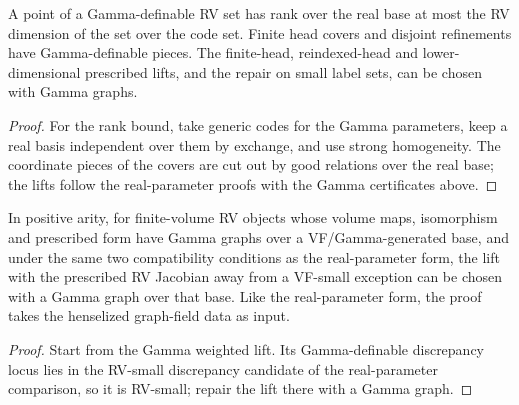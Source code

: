 \begin{lemma}
\label{lem:gamma-head-lifts}
\leanok
A point of a Gamma-definable RV set has rank over the real base at most
the RV dimension of the set over the code set. Finite head covers and disjoint
refinements have Gamma-definable pieces. The finite-head,
reindexed-head and lower-dimensional prescribed lifts, and the repair
on small label sets, can be chosen with Gamma graphs.
\end{lemma}
\begin{proof}
\leanok
For the rank bound, take generic codes for the Gamma parameters,
keep a real basis independent over them by exchange, and use strong
homogeneity. The coordinate pieces of the covers are cut out by good
relations over the real base; the lifts follow the real-parameter
proofs with the Gamma certificates above.
\end{proof}

\begin{theorem}
\label{thm:gamma-prescribed-lift}
\leanok
In positive arity, for finite-volume RV objects whose volume maps,
isomorphism and prescribed form have Gamma graphs over a
VF/Gamma-generated base, and under the same two compatibility
conditions as the real-parameter form, the lift with the prescribed RV Jacobian away
from a VF-small exception can be chosen with a Gamma graph over that
base. Like the real-parameter form, the proof takes the henselized
graph-field data as input.
\end{theorem}
\begin{proof}
\leanok
{}
Start from the Gamma weighted lift. Its Gamma-definable discrepancy
locus lies in the RV-small discrepancy candidate of the real-parameter
comparison, so it is RV-small; repair the lift there with a Gamma
graph.
\end{proof}

